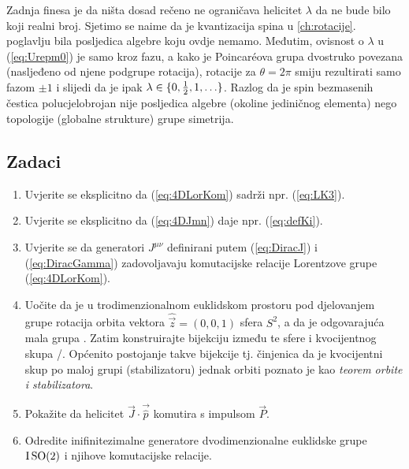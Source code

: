 Zadnja finesa je da ništa dosad rečeno ne ograničava helicitet $\lambda$
da ne bude bilo koji realni broj. Sjetimo se naime da je kvantizacija
spina u \ref{ch:rotacije}. poglavlju bila posljedica  algebre
koju ovdje nemamo. Međutim, ovisnost o $\lambda$
u (\ref{eq:Urepm0}) je samo kroz fazu, a kako je Poincar\'{e}ova grupa
dvostruko povezana (nasljeđeno od njene  podgrupe rotacija),
rotacije za $\theta=2\pi$ smiju rezultirati samo fazom $\pm 1$ i
slijedi da je ipak $\lambda \in \{0, \frac{1}{2}, 1, \ldots\}$. Razlog
da je spin bezmasenih čestica polucjelobrojan nije posljedica
algebre (okoline jediničnog elementa) nego topologije (globalne strukture)
grupe simetrija.





\subsection*{Zadaci}

\begin{enumerate}[label=\arabic{chapter}.\arabic*.]

\item Uvjerite se eksplicitno da (\ref{eq:4DLorKom}) sadrži npr. (\ref{eq:LK3}).

\item Uvjerite se eksplicitno da (\ref{eq:4DJmn}) daje npr. (\ref{eq:defKi}).

\item Uvjerite se da generatori $J^{\mu\nu}$ definirani putem
(\ref{eq:DiracJ}) i (\ref{eq:DiracGamma}) zadovoljavaju komutacijske
relacije Lorentzove grupe (\ref{eq:4DLorKom}).

\item Uočite da je u trodimenzionalnom euklidskom prostoru pod djelovanjem grupe rotacija 
    orbita vektora $\hat{\vec{z}} = (0, 0, 1)$ sfera $S^2$, a da je odgovarajuća
    mala grupa . Zatim konstruirajte bijekciju između te sfere i kvocijentnog
    skupa /. Općenito postojanje takve bijekcije tj. činjenica da je
    kvocijentni skup po maloj grupi (stabilizatoru)
    jednak orbiti poznato je kao \emph{teorem orbite i stabilizatora}.

\item Pokažite da helicitet $\vec{J}\cdot\vec{\hat{p}}$ komutira s impulsom $\vec{P}$.
    \label{zad:help}

\item Odredite inifinitezimalne generatore dvodimenzionalne euklidske
    grupe $\mathrm{I}\,\mathrm{SO}(2)$ i njihove komutacijske relacije.\label{zad:iso2gen}
\end{enumerate}
